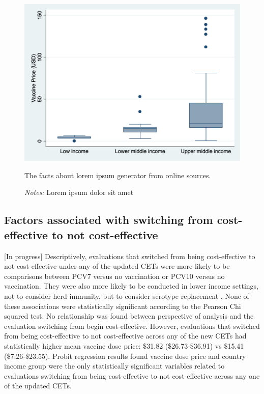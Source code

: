 \documentclass[12pt]{article}
\begin{document}
\begin{figure}[H]
    \centering
    \includegraphics[width=1\linewidth]{output/figures/dose-price-income.png}
    \caption{The facts about lorem ipsum generator from online sources.}
    \label{fig:enter-label}
    \caption*{\footnotesize \textit{Notes:} Lorem ipsum dolor sit amet}
\end{figure}


\subsection{Factors associated with switching from cost-effective to not cost-effective}
[In progress]
Descriptively, evaluations that switched from being cost-effective to not cost-effective under any of the updated CETs were more likely to be comparisons between PCV7 versus no vaccination or PCV10 versus no vaccination. They were also more likely to be conducted in lower income settings, not to consider herd immunity, but to consider serotype replacement . None of these associations were statistically significant according to the Pearson Chi squared test. No relationship was found between perspective of analysis and the evaluation switching from begin cost-effective. However, evaluations that switched from being cost-effective to not cost-effective across any of the new CETs had statistically higher mean vaccine dose price: \$31.82 (\$26.73-\$36.91) vs \$15.41 (\$7.26-\$23.55).  Probit regression results found vaccine dose price and country income group were the only statistically significant variables related to evaluations switching from being cost-effective to not cost-effective across any one of the updated CETs.
\end{document}

